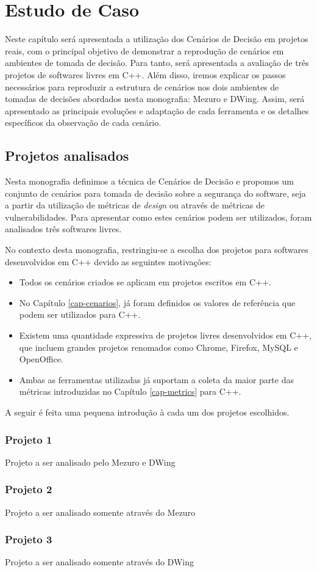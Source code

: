 \chapter{Estudo de Caso}
\label{cap-case-study}

%

Neste capítulo será apresentada a utilização dos Cenários de Decisão em projetos reais, com o principal objetivo de demonstrar a reprodução de cenários em ambientes de tomada de decisão. Para tanto, será apresentada a avaliação de três projetos de softwares livres em C++. Além disso, iremos explicar os passos necessários para reproduzir a estrutura de cenários nos dois ambientes de tomadas de decisões abordados nesta monografia: Mezuro e DWing. Assim, será apresentado as principais evoluções e adaptação de cada ferramenta e os detalhes específicos da observação de cada cenário.

\section{Projetos analisados}
\label{cap-mezuro}

Nesta monografia definimos a técnica de Cenários de Decisão e propomos um conjunto de cenários para tomada de decisão sobre a segurança do software, seja a partir da utilização de métricas de \emph{design} ou através de métricas de vulnerabilidades. Para apresentar como estes cenários podem ser utilizados, foram analisados três softwares livres. 

No contexto desta monografia, restringiu-se a escolha dos projetos para softwares desenvolvidos em C++ devido as seguintes motivações:

\begin{itemize}
\item Todos os cenários criados se aplicam em projetos escritos em C++.
\item No Capítulo \ref{cap-cenarios}, já foram definidos os valores de referência que podem ser utilizados para C++.
\item Existem uma quantidade expressiva de projetos livres desenvolvidos em C++, que incluem grandes projetos renomados como Chrome, Firefox, MySQL e OpenOffice.
\item Ambas as ferramentas utilizadas já suportam a coleta da maior parte das métricas introduzidas no Capítulo \ref{cap-metrics} para C++.
\end{itemize}

A seguir é feita uma pequena introdução à cada um dos projetos escolhidos.

\subsection{Projeto 1}
\label{}

Projeto a ser analisado pelo Mezuro e DWing

\subsection{Projeto 2}
\label{}

Projeto a ser analisado somente através do Mezuro

\subsection{Projeto 3}
\label{}

Projeto a ser analisado somente através do DWing
